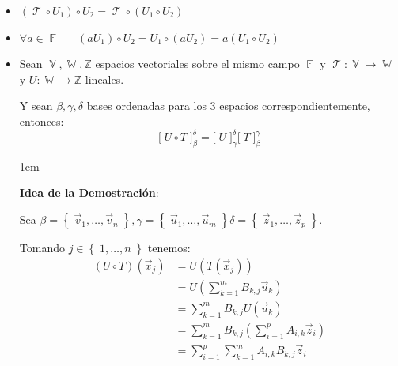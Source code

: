 \documentclass[12pt, fleqn]{report}                             %
\newenvironment{SmallIndentation}[1][0.75em]                    %
        {\begin{adjustwidth}{#1}{}\begin{footnotesize}}             %
        {\end{footnotesize}\end{adjustwidth}}                       %
\DeclareMathOperator \Space     {\quad}                         %
\theoremstyle{break}                                            %
\DeclareMathOperator \GenericField {\mathbb{F}}                 %
\DeclareMathOperator \VectorSet    {\mathbb{V}}                 %
\DeclareMathOperator \SubVectorSet {\mathbb{W}}                 %
\DeclareMathOperator \LinTrans      {\mathcal{T}}               %
\newcommand{\Set}[1]            {\left\{ \; #1 \; \right\}}     %
\newcommand{\Wrap}[1]           {\left( #1 \right)}             %
\newcommand{\bigBrackets}[1]    {\big[ \; #1 \; \big]}          %
\begin{document}
\begin{itemize}
                    \item 
                        $(\LinTrans \circ U_1) \circ U_2 = \LinTrans \circ (U_1 \circ U_2)$


                    \item 
                        $\forall a \in \GenericField \Space (a U_1) \circ U_2 = U_1 \circ (aU_2) = a(U_1 \circ U_2)$

                    \clearpage

                    \item
                        Sean $\VectorSet, \SubVectorSet, \mathbb{Z}$ espacios vectoriales sobre el mismo campo
                        $\GenericField$ y $\LinTrans: \VectorSet \to \SubVectorSet$ y $U: \SubVectorSet \to \mathbb{Z}$
                        lineales.

                        Y sean $\beta, \gamma, \delta$ bases ordenadas para los 3 espacios correspondientemente, entonces:
                        \begin{equation*}
                            \bigBrackets{U \circ T}_\beta^\delta 
                                = \bigBrackets{U}_\gamma^\delta \bigBrackets{T}_\beta^\gamma
                        \end{equation*}

                        \begin{SmallIndentation}[1em]
                            \textbf{Idea de la Demostración}:
                            
                            Sea $\beta = \Set{\vec v_1, \dots, \vec v_n}, \gamma = \Set{\vec u_1, \dots, \vec u_m}
                            \delta = \Set{\vec z_1, \dots, \vec z_p}$.

                            Tomando $j \in \Set{1, \dots, n}$ tenemos:
                            \begin{align*}
                                (U \circ T)(\vec x_j)
                                    &= U \Wrap{T\Wrap{\vec x_j}}                                        \\ 
                                    &= U \Wrap{\sum_{k = 1}^m B_{k, j} \vec u_k}                        \\ 
                                    &= \sum_{k = 1}^m B_{k, j} U(\vec u_k)                              \\ 
                                    &= \sum_{k = 1}^m B_{k, j} \Wrap{\sum_{i=1}^p A_{i, k} \vec z_i}    \\ 
                                    &= \sum_{i=1}^p \sum_{k = 1}^m A_{i, k} B_{k, j}  \vec z_i
                            \end{align*}


\end{SmallIndentation}
\end{itemize}
\end{document}
